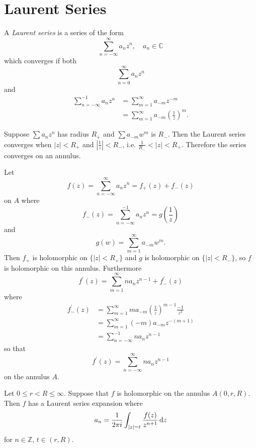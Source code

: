 \section{Laurent Series}

\begin{defn}
A \emph{Laurent series} is a series of the form
$$
\sum_{n=-\infty}^\infty a_n z^n, \quad a_n \in \mathbb{C}
$$
which converges if both
$$
\sum_{n=0}^\infty a_n z^n
$$
and
\begin{align*}
   \sum_{n=-\infty}^{-1} a_n z^n
&= \sum_{m=1}^\infty a_{-m} z^{-m} \\
&= \sum_{m=1}^\infty a_{-m} \left(\frac{1}{z}\right)^m.
\end{align*}
\end{defn}

Suppose $\sum a_n z^n$ has radius $R_+$ and
$\sum a_{-m} w^m$ is $R_-$. Then the Laurent series
converges when $|z| < R_+$ and $\left|\frac{1}{z}\right| < R_-$,
i.e. $\frac{1}{R_-} < |z| < R_+$. Therefore the series converges
on an annulus.

Let
$$
f(z) = \sum_{n=-\infty}^\infty a_n z^n = f_+(z) + f_-(z)
$$
on $A$ where
$$
f_-(z) = \sum_{n=-\infty}^{-1} a_n z^n = g\left(\frac{1}{z}\right)
$$
and
$$
g(w) = \sum_{m=1}^\infty a_{-m} w^m.
$$
Then $f_+$ is holomorphic on $\{ |z| < R_+ \}$ and
$g$ is holomorphic on $\{ |z| < R_- \}$, so
$f$ is holomorphic on this annulus. Furthermore
$$
  f^\prime(z)
= \sum_{m=1}^\infty n a_n z^{n-1}
+ f_-^\prime(z)
$$
where
\begin{align*}
   f_-^\prime(z)
&= \sum_{m=1}^\infty
     m a_{-m}
     \left(\frac{1}{z}\right)^{m-1}
     \frac{-1}{z^2} \\
&= \sum_{m=1}^\infty (-m) a_{-m} z^{-(m+1)} \\
&= \sum_{n=-\infty}^{-1} n a_n z^{n-1}
\end{align*}
so that
$$
f^\prime(z) = \sum_{n=-\infty}^\infty n a_n z^{n-1}
$$
on the annulus $A$.

\begin{theorem}
Let $0 \leq r < R \leq \infty$. Suppose that $f$ is holomorphic
on the annulus $A(0, r, R)$. Then $f$ has a Laurent series expansion
where
$$
a_n = \frac{1}{2 \pi i} \int_{|z| = t} \frac{f(z)}{z^{n+1}} \mathop{}\!\mathrm{d} z
$$
for $n \in \mathbb{Z}$, $t \in (r, R)$.
\end{theorem}

